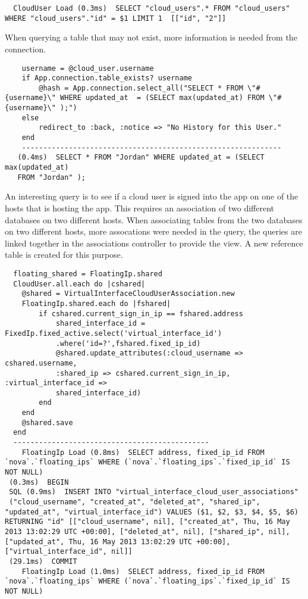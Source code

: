 \documentclass[12pt]{article}
\begin{document}
\begin{enumerate}
\begin{lstlisting}
  CloudUser Load (0.3ms)  SELECT "cloud_users".* FROM "cloud_users" WHERE "cloud_users"."id" = $1 LIMIT 1  [["id", "2"]]
\end{lstlisting}
When querying a table that may not exist, more information is needed from the connection.
\begin{lstlisting}
    username = @cloud_user.username
    if App.connection.table_exists? username
        @hash = App.connection.select_all("SELECT * FROM \"#{username}\" WHERE updated_at  = (SELECT max(updated_at) FROM \"#{username}\" );")
    else 
        redirect_to :back, :notice => "No History for this User."
    end
    -------------------------------------------------------------
   (0.4ms)  SELECT * FROM "Jordan" WHERE updated_at = (SELECT max(updated_at)
   FROM "Jordan" );
\end{lstlisting}
An interesting query is to see if a cloud user is signed into the app on one of the hosts that is hosting the app. This requires an association of two different databases on two different hosts.
When associating tables from the two databases on two different hosts, more assocations were needed in the query, the queries are linked together in the associations controller to provide the view. A new reference table is created for this purpose.
\begin{lstlisting}
  floating_shared = FloatingIp.shared
  CloudUser.all.each do |cshared|
    @shared = VirtualInterfaceCloudUserAssociation.new
    FloatingIp.shared.each do |fshared|
        if cshared.current_sign_in_ip == fshared.address
            shared_interface_id = FixedIp.fixed_active.select('virtual_interface_id')
            .where('id=?',fshared.fixed_ip_id)
            @shared.update_attributes(:cloud_username => cshared.username, 
            :shared_ip => cshared.current_sign_in_ip, :virtual_interface_id => 
            shared_interface_id)
        end
    end
    @shared.save
  end
  ----------------------------------------------
    FloatingIp Load (0.8ms)  SELECT address, fixed_ip_id FROM `nova`.`floating_ips` WHERE (`nova`.`floating_ips`.`fixed_ip_id` IS NOT NULL)
 (0.3ms)  BEGIN
 SQL (0.9ms)  INSERT INTO "virtual_interface_cloud_user_associations" 
 ("cloud_username", "created_at", "deleted_at", "shared_ip", "updated_at", "virtual_interface_id") VALUES ($1, $2, $3, $4, $5, $6) RETURNING "id" [["cloud_username", nil], ["created_at", Thu, 16 May 2013 13:02:29 UTC +00:00], ["deleted_at", nil], ["shared_ip", nil], ["updated_at", Thu, 16 May 2013 13:02:29 UTC +00:00], ["virtual_interface_id", nil]]
 (29.1ms)  COMMIT
    FloatingIp Load (1.0ms)  SELECT address, fixed_ip_id FROM `nova`.`floating_ips` WHERE (`nova`.`floating_ips`.`fixed_ip_id` IS NOT NULL)

\end{lstlisting}
\end{enumerate}
\end{document}
